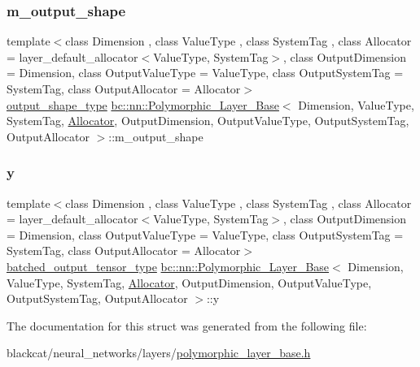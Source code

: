 \mbox{\label{structbc_1_1nn_1_1Polymorphic__Layer__Base_a6706ea4d62aee77f603a0c723e7088eb}} 
\subsubsection{\texorpdfstring{m\+\_\+output\+\_\+shape}{m\_output\_shape}}
{\footnotesize\ttfamily template$<$class Dimension , class Value\+Type , class System\+Tag , class Allocator  = layer\+\_\+default\+\_\+allocator$<$\+Value\+Type, System\+Tag$>$, class Output\+Dimension  = Dimension, class Output\+Value\+Type  = Value\+Type, class Output\+System\+Tag  = System\+Tag, class Output\+Allocator  = Allocator$>$ \\
\hyperlink{structbc_1_1nn_1_1Polymorphic__Layer__Base_a130df92a457150349fe554eeee4dd32a}{output\+\_\+shape\+\_\+type} \hyperlink{structbc_1_1nn_1_1Polymorphic__Layer__Base}{bc\+::nn\+::\+Polymorphic\+\_\+\+Layer\+\_\+\+Base}$<$ Dimension, Value\+Type, System\+Tag, \hyperlink{classbc_1_1allocators_1_1Allocator}{Allocator}, Output\+Dimension, Output\+Value\+Type, Output\+System\+Tag, Output\+Allocator $>$\+::m\+\_\+output\+\_\+shape\hspace{0.3cm}{\ttfamily [protected]}}

\mbox{\label{structbc_1_1nn_1_1Polymorphic__Layer__Base_a6f05310307def656069b64a7fb7cbf91}} 
\subsubsection{\texorpdfstring{y}{y}}
{\footnotesize\ttfamily template$<$class Dimension , class Value\+Type , class System\+Tag , class Allocator  = layer\+\_\+default\+\_\+allocator$<$\+Value\+Type, System\+Tag$>$, class Output\+Dimension  = Dimension, class Output\+Value\+Type  = Value\+Type, class Output\+System\+Tag  = System\+Tag, class Output\+Allocator  = Allocator$>$ \\
\hyperlink{structbc_1_1nn_1_1Polymorphic__Layer__Base_a45ed57549be9c4e5c40c52168ca15ae9}{batched\+\_\+output\+\_\+tensor\+\_\+type} \hyperlink{structbc_1_1nn_1_1Polymorphic__Layer__Base}{bc\+::nn\+::\+Polymorphic\+\_\+\+Layer\+\_\+\+Base}$<$ Dimension, Value\+Type, System\+Tag, \hyperlink{classbc_1_1allocators_1_1Allocator}{Allocator}, Output\+Dimension, Output\+Value\+Type, Output\+System\+Tag, Output\+Allocator $>$\+::y}



The documentation for this struct was generated from the following file\+:\begin{DoxyCompactItemize}
\item 
blackcat/neural\+\_\+networks/layers/\hyperlink{layers_2polymorphic__layer__base_8h}{polymorphic\+\_\+layer\+\_\+base.\+h}\end{DoxyCompactItemize}
